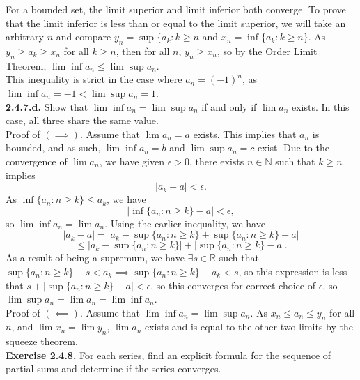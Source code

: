 \documentclass[12pt,letterpaper]{article}
\begin{document}
For a bounded set, the limit superior and limit inferior both converge. To prove that the limit inferior is less than or equal to the limit superior, we will take an arbitrary \(n\) and compare \(y_{n} = \sup\{a_{k} : k \geq n\) and \(x_{n} = \inf\{a_{k} : k \geq n\}\). As \(y_{n} \geq a_{k} \geq x_{n}\) for all \(k \geq n\), then for all \(n\), \(y_{n} \geq x_{n}\), so by the Order Limit Theorem, \(\lim\inf a_{n} \leq \lim\sup a_{n}\). \\

This inequality is strict in the case where \(a_{n} = (-1)^{n}\), as \(\lim\inf a_{n} = -1 < \lim\sup a_{n} = 1\). \\

\textbf{2.4.7.d.} Show that \(\lim\inf a_{n} = \lim\sup a_{n}\) if and only if \(\lim a_{n}\) exists. In this case, all three share the same value. \\

Proof of \((\implies)\). Assume that \(\lim a_{n} = a\) exists. This implies that \(a_{n}\) is bounded, and as such, \(\lim\inf a_{n} = b\) and \(\lim\sup a_{n} = c\) exist. Due to the convergence of \(\lim a_{n}\), we have given \(\epsilon > 0\), there exists \(n \in \mathbb{N}\) such that \(k \geq n\) implies \[|a_{k} - a| < \epsilon.\] As \(\inf\{a_{n} : n \geq k\} \leq a_{k}\), we have \[|\inf\{a_{n}:  n \geq k\} - a| < \epsilon,\] so \(\lim\inf a_{n} = \lim a_{n}\). Using the earlier inequality, we have \[|a_{k} - a| = |a_{k} - \sup\{a_{n} : n \geq k\} + \sup\{a_{n} : n \geq k\} - a |\] \[\leq |a_{k} - \sup\{a_{n} : n \geq k\}| + |\sup\{a_{n} : n \geq k\} - a|.\] As a result of being a supremum, we have \(\exists s \in \mathbb{R}\) such that \(\sup\{a_{n} : n \geq k \} - s < a_{k} \implies \sup\{a_{n} : n \geq k\} - a_{k} < s\), so this expression is less that \(s + |\sup\{a_{n} : n\geq k\} - a| < \epsilon\), so this converges for correct choice of \(\epsilon\), so \(\lim\sup a_{n} = \lim a_{n} = \lim\inf a_{n}\). \\


Proof of \((\impliedby)\). Assume that \(\lim\inf a_{n} = \lim\sup a_{n}\). As \(x_{n} \leq a_{n} \leq y_{n}\) for all \(n\), and \(\lim x_{n} = \lim y_{n}\), \(\lim a_{n}\) exists and is equal to the other two limits by the squeeze theorem. \\


\textbf{Exercise 2.4.8.} For each series, find an explicit formula for the sequence of partial sums and determine if the series converges. \\
\end{document}

